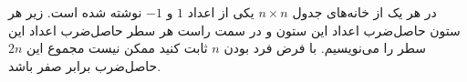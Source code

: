 \EXERCISE
در هر یک از خانه‌های جدول
$n \times n$
یکی از اعداد
$1$
و
$-1$
نوشته شده است. زیر هر ستون حاصل‌ضرب اعداد این ستون و در سمت راست هر سطر حاصل‌ضرب اعداد این سطر را می‌نویسیم. با فرض فرد بودن
$n$
ثابت کنید ممکن نیست مجموع این
$2n$
حاصل‌ضرب برابر صفر باشد.
